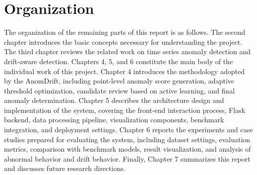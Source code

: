 \section{Organization}
The organization of the remaining parts of this report is as follows. The second chapter introduces the basic concepts necessary for understanding the project. The third chapter reviews the related work on time series anomaly detection and drift-aware detection. Chapters 4, 5, and 6 constitute the main body of the individual work of this project. Chapter 4 introduces the methodology adopted by the AnomDrift, including point-level anomaly score generation, adaptive threshold optimization, candidate review based on active learning, and final anomaly determination. Chapter 5 describes the architecture design and implementation of the system, covering the front-end interaction process, Flask backend, data processing pipeline, visualization components, benchmark integration, and deployment settings. Chapter 6 reports the experiments and case studies prepared for evaluating the system, including dataset settings, evaluation metrics, comparison with benchmark models, result visualization, and analysis of abnormal behavior and drift behavior. Finally, Chapter 7 summarizes this report and discusses future research directions.